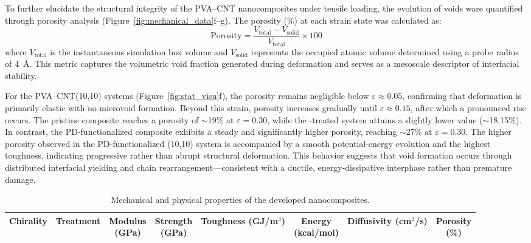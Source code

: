 \documentclass[journal=jacsat,manuscript=article]{achemso}
\begin{document}
{To further elucidate the structural integrity of the PVA--CNT nanocomposites under tensile loading, the evolution of voids  ware quantified through porosity analysis (Figure~\ref{fig:mechanical_data}f--g). The porosity (\%) at each strain state was calculated as:
\[
\text{Porosity} = \frac{V_\text{total} - V_\text{solid}}{V_\text{total}} \times 100 \tag{3}
\]
where $V_\text{total}$ is the instantaneous simulation box volume and $V_\text{solid}$ represents the occupied atomic volume determined using a probe radius of 4~\AA. This metric captures the volumetric void fraction generated during deformation and serves as a mesoscale descriptor of interfacial stability.

\medskip

For the PVA--CNT(10,10) systems (Figure~\ref{fig:stat_visu}f), the porosity remains negligible below $\varepsilon \approx 0.05$, confirming that deformation is primarily elastic with no microvoid formation. Beyond this strain, porosity increases gradually until $\varepsilon \approx 0.15$, after which a pronounced rise occurs. The pristine composite reaches a porosity of $\sim$19\% at $\varepsilon=0.30$, while the -treated system attains a slightly lower value ($\sim$18.15\%). In contrast, the PD-functionalized composite exhibits a steady and significantly higher porosity, reaching $\sim$27\% at $\varepsilon=0.30$. The higher porosity observed in the PD-functionalized (10,10) system is accompanied by a smooth potential-energy evolution and the highest toughness, indicating progressive rather than abrupt structural deformation. This behavior suggests that void formation occurs through distributed interfacial yielding and chain rearrangement—consistent with a ductile, energy-dissipative interphase rather than premature damage.


\begin{table}[htbp]
\centering
\caption{Mechanical and physical properties of the developed nanocomposites.}
\label{tab:actual_mechanical_properties}

\small   %
\setlength{\tabcolsep}{4pt}  %

\begin{tabular}{l l c c c c c c}
\toprule
\textbf{Chirality} & \textbf{Treatment} 
& \makecell{\textbf{Modulus}\\(GPa)}
& \makecell{\textbf{Strength}\\(GPa)}
& \makecell{\textbf{Toughness}\\(GJ/m$^{3}$)}
& \makecell{\textbf{Energy}\\(kcal/mol)}
& \makecell{\textbf{Diffusivity}\\(cm$^{2}$/s)}
& \makecell{\textbf{Porosity}\\(\%)} \\
\midrule


\end{tabular}
\end{table}}
\end{document}
